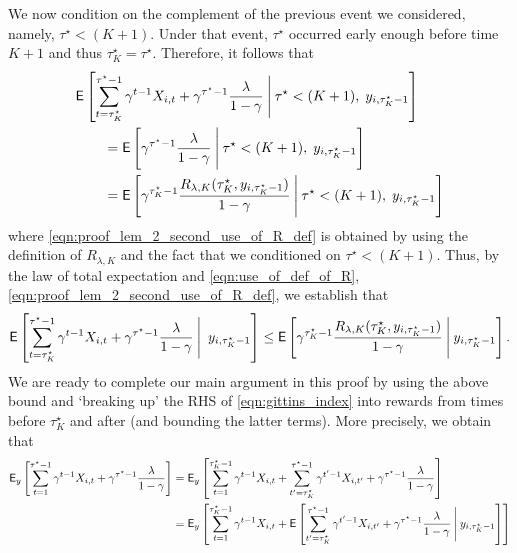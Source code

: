 \begin{myproof}[Proof.]
	We now condition on the complement of the previous event we considered, namely, $\tau^\star < (K+1)$. Under that event, $\tau^\star$ occurred early enough before time $K+1$ and thus $\tau^\star_K = \tau^\star$. Therefore, it follows that
	\begin{align} 
	&\E\left[\sum_{t=\tau_K^\star}^{\tau^\star-1}\gamma^{t-1} X_{i,t} + \gamma^{\tau^\star-1} \frac{\lambda}{1-\gamma}
	\given[\Bigg] \tau^\star < (K+1), \;y_{i,\tau^\star_K-1} \right] \nonumber  \\
	&\qquad = \E\left[\gamma^{\tau^\star-1}  \frac{\lambda}{1-\gamma}
	\given[\Bigg]\tau^\star < (K+1), \; y_{i,\tau^\star_K-1} \right] \nonumber \\
	&\qquad = \E\left[\gamma^{\tau^\star_K-1}  \frac{R_{\lambda,K}(\tau^\star_K, y_{i,\tau^\star_K-1})}{1-\gamma}
	\given[\Bigg]\tau^\star < (K+1), \; y_{i,\tau^\star_K-1} \right] \label{eqn:proof_lem_2_second_use_of_R_def}
	\end{align}
	where \eqref{eqn:proof_lem_2_second_use_of_R_def} is obtained by using the definition of $R_{\lambda,K}$ and the fact that we conditioned on $\tau^\star < (K+1)$. Thus, by the law of total expectation and \eqref{eqn:use_of_def_of_R}, \eqref{eqn:proof_lem_2_second_use_of_R_def}, we establish that
	\begin{equation} \label{ineq:proof_lem_2_main_bound_in_proof}
	\E\left[\sum_{t=\tau_K^\star}^{\tau^\star-1}\gamma^{t-1} X_{i,t} + \gamma^{\tau^\star-1} \frac{\lambda}{1-\gamma}
	\given[\Bigg] \;y_{i,\tau^\star_K-1} \right] \le \Ee{\gamma^{\tau^\star_K-1}  \frac{R_{\lambda,K}(\tau^\star_K, y_{i,\tau^\star_K-1})}{1-\gamma} \given[\Bigg] y_{i,\tau^\star_K-1}}.
	\end{equation}
	We are ready to complete our main argument in this proof by using the above bound and `breaking up' the RHS of \eqref{eqn:gittins_index} into rewards from times before $\tau_K^\star$ and after (and bounding the latter terms). More precisely, we obtain that
	\begin{align}
	\E_{y}\left[\sum_{t=1}^{\tau^\star-1}\gamma^{t-1} X_{i,t} + \gamma^{\tau^\star-1}\frac{\lambda}{1-\gamma}\right] & = \E_{y}\left[\sum_{t=1}^{\tau^\star_K-1}\gamma^{t-1} X_{i,t} + \sum_{t'=\tau^\star_K}^{\tau^\star-1}\gamma^{t'-1} X_{i,t'} +  \gamma^{\tau^\star-1}\frac{\lambda}{1-\gamma}\right] \nonumber \\
	& = \E_{y}\left[\sum_{t=1}^{\tau^\star_K-1}\gamma^{t-1} X_{i,t} + \Ee{\sum_{t'=\tau^\star_K}^{\tau^\star-1}\gamma^{t'-1} X_{i,t'} +  \gamma^{\tau^\star-1}\frac{\lambda}{1-\gamma} \given[\Bigg] y_{i,\tau^\star_K-1} }\right] \label{eqn:proof_lem_2_tower_prop_again} \\

\end{align}
\end{myproof}
